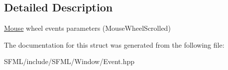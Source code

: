 \subsection{Detailed Description}
\mbox{\hyperlink{classsf_1_1_mouse}{Mouse}} wheel events parameters (Mouse\+Wheel\+Scrolled) 

\begin{DoxyVerb}\end{DoxyVerb}
 

The documentation for this struct was generated from the following file\+:\begin{DoxyCompactItemize}
\item 
S\+F\+M\+L/include/\+S\+F\+M\+L/\+Window/Event.\+hpp\end{DoxyCompactItemize}
